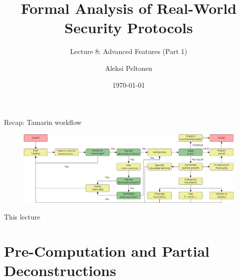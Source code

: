 \documentclass[11pt,aspectratio=169]{beamer}
\title{Formal Analysis of Real-World Security Protocols}
\subtitle{Lecture 8: Advanced Features (Part 1)}
\date{\today}
\author{Aleksi Peltonen}
\institute{CISPA Helmholtz Center for Information Security}
\begin{document}
\maketitle


\begin{frame}[fragile]{Recap: Tamarin workflow}
    \begin{figure}
        \includegraphics[width=\textwidth]{./figures/lecture_9/workflow_gui}
    \end{figure}
\end{frame}

\begin{frame}[fragile]{This lecture}
    \tableofcontents
\end{frame}


\section{Pre-Computation and Partial Deconstructions}

\end{document}
